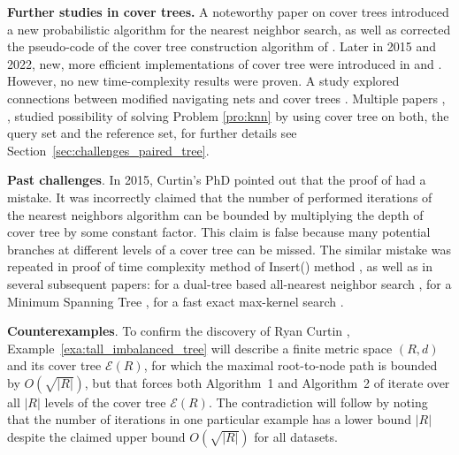 \documentclass{vgtc}                          %
\numberwithin{algocf}{section}
\theoremstyle{definition}
\theoremstyle{definition}
\theoremstyle{definition}
\theoremstyle{plain}
\newcommand{\T}{\mathcal{E}}
\begin{document}
\medskip
\noindent 
\textbf{Further studies in cover trees.} A noteworthy paper on cover trees \cite{kollar2006fast} introduced a new probabilistic algorithm for the nearest neighbor search, as well as corrected the pseudo-code of the cover tree construction algorithm of \cite[Algorithm~2]{beygelzimer2006cover}.
Later in 2015 and 2022, new, more efficient implementations of cover tree were introduced in \cite{izbicki2015faster} and \cite{Sheehy2022}. However, no new time-complexity results were proven. A study \cite{jahanseir2016transforming} explored connections between modified navigating nets \cite{cole2006searching} and cover trees \cite{beygelzimer2006cover}.
 Multiple papers \cite{beygelzimer2006coverExtend}, \cite{ram2009linear}, \cite{curtin2015plug} studied possibility of solving Problem \ref{pro:knn} by using cover tree on both, the query set and the reference set, for further details see Section~\ref{sec:challenges_paired_tree}.

\medskip

\noindent
\textbf{Past challenges}. 
In 2015, Curtin's PhD \cite[section~5.3]{curtin2015improving} pointed out that the proof of \cite[Theorem~5]{beygelzimer2006cover} had a mistake.  It was incorrectly claimed that the number of performed iterations of the nearest neighbors algorithm \cite[Algorithm~1]{beygelzimer2006cover} can be bounded by multiplying the depth of cover tree by some constant factor. 
This claim is false because many potential branches at different levels of a cover tree can be missed. 
The similar mistake was repeated in proof of time complexity method of Insert() method \cite[Theorem~6]{beygelzimer2006cover}, as well as in several subsequent papers: for a dual-tree based all-nearest neighbor search \cite[Theorem~3.1]{ram2009linear}, for a Minimum Spanning Tree \cite[Theorem~5.1]{march2010fast}, for a fast exact max-kernel search \cite[Lemma~5.2]{curtin2013fast}. 
\medskip

\noindent
\textbf{Counterexamples}.
To confirm the discovery of Ryan Curtin \cite[section~5.3]{curtin2015improving}, Example~\ref{exa:tall_imbalanced_tree} will describe a finite metric space $(R,d)$ and its cover tree $\T(R)$, for which the maximal root-to-node path is bounded by $O(\sqrt{|R|})$, but that forces both Algorithm~1 and Algorithm~2 of \cite{beygelzimer2006cover} iterate over all $|R|$ levels of the cover tree $\T(R)$. 
The contradiction will follow by noting that the number of iterations in one particular example has a lower bound $|R|$ despite the claimed upper bound $O(\sqrt{|R|})$ for all datasets. 
\medskip
\end{document}

